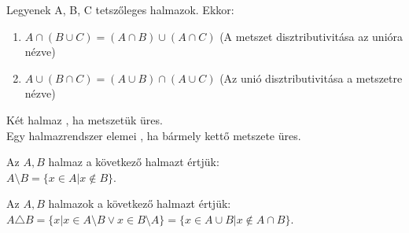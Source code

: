 \begin{frame}
  \begin{tcolorbox}[title={Tétel: Unió és metszet disztributivitása}]
    Legyenek A, B, C tetszőleges halmazok. Ekkor:

    \begin{enumerate}
      \item $A \cap (B \cup C) = (A \cap B) \cup (A \cap C)$ (A metszet disztributivitása az unióra nézve)
      \item $A \cup (B \cap C) = (A \cup B) \cap (A \cup C)$ (Az unió disztributivitása a metszetre nézve)
    \end{enumerate}
  \end{tcolorbox}
\end{frame}

\begin{frame}
  \begin{tcolorbox}[title={Def.: Diszjunkt, Páronként diszjunkt halmazok.}]
    Két halmaz , ha metszetük üres.\\
    Egy halmazrendszer elemei , ha bármely kettő metszete üres.
  \end{tcolorbox}

  \begin{tcolorbox}[title={Def.: Halmazok Különbsége}]
    Az $A, B$ halmaz  a következő halmazt értjük:\\
    $A \setminus B = \{ x \in A | x \notin B \}$.
  \end{tcolorbox}

  \begin{tcolorbox}[title={Def.: Halmazok Szimmetrikus Differenciája}]
    Az $A, B$ halmazok  a következő halmazt értjük:\\
    $A \triangle B = \{ x | x \in A \setminus B \lor x \in B \setminus A \} = \{ x \in A \cup B | x \notin A \cap B \}$.
  \end{tcolorbox}
\end{frame}

